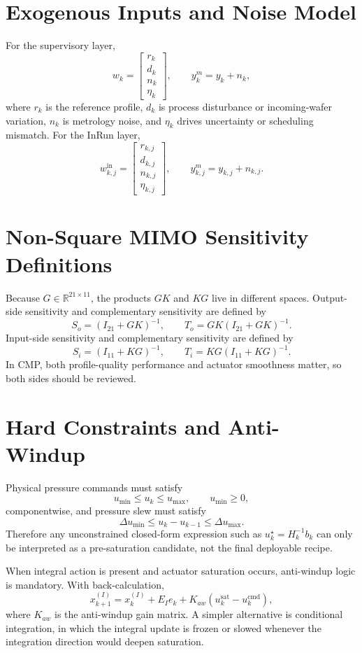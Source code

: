 \documentclass[11pt,a4paper]{article}
\newcommand{\R}{\mathbb{R}}
\begin{document}
\section{Exogenous Inputs and Noise Model}
For the supervisory layer,
\[
w_k=\begin{bmatrix}r_k\\d_k\\n_k\\\eta_k\end{bmatrix},\qquad y_k^m=y_k+n_k,
\]
where $r_k$ is the reference profile, $d_k$ is process disturbance or incoming-wafer variation, $n_k$ is metrology noise, and $\eta_k$ drives uncertainty or scheduling mismatch.
For the InRun layer,
\[
w^{\mathrm{in}}_{k,j}=\begin{bmatrix}r_{k,j}\\d_{k,j}\\n_{k,j}\\\eta_{k,j}\end{bmatrix},\qquad y^m_{k,j}=y_{k,j}+n_{k,j}.
\]

\section{Non-Square MIMO Sensitivity Definitions}
Because $G\in\R^{21\times 11}$, the products $GK$ and $KG$ live in different spaces. Output-side sensitivity and complementary sensitivity are defined by
\[
S_o=(I_{21}+GK)^{-1},\qquad T_o=GK(I_{21}+GK)^{-1}.
\]
Input-side sensitivity and complementary sensitivity are defined by
\[
S_i=(I_{11}+KG)^{-1},\qquad T_i=KG(I_{11}+KG)^{-1}.
\]
In CMP, both profile-quality performance and actuator smoothness matter, so both sides should be reviewed.

\section{Hard Constraints and Anti-Windup}
Physical pressure commands must satisfy
\[
u_{\min}\le u_k\le u_{\max},\qquad u_{\min}\ge 0,
\]
componentwise, and pressure slew must satisfy
\[
\Delta u_{\min}\le u_k-u_{k-1}\le\Delta u_{\max}.
\]
Therefore any unconstrained closed-form expression such as $u_k^{\star}=H_k^{-1}b_k$ can only be interpreted as a pre-saturation candidate, not the final deployable recipe.

When integral action is present and actuator saturation occurs, anti-windup logic is mandatory. With back-calculation,
\[
x_{k+1}^{(I)}=x_k^{(I)}+E_I e_k+K_{aw}(u_k^{\mathrm{sat}}-u_k^{\mathrm{cmd}}),
\]
where $K_{aw}$ is the anti-windup gain matrix. A simpler alternative is conditional integration, in which the integral update is frozen or slowed whenever the integration direction would deepen saturation.
\end{document}
